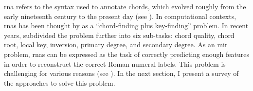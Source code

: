 

\gls{rna} refers to the syntax used to annotate chords,
which evolved roughly from the early nineteenth century to
the present day (see
). In
computational contexts, \glspl{rna} has been thought by
\textcite{temperley1997algorithm} as a ``chord-finding plus
key-finding'' problem. In recent years,
\textcite{chen2018functional} subdivided the problem further
into six sub-tasks: chord quality, chord root, local key,
inversion, primary degree, and secondary degree. As an
\gls{mir} problem, \glspl{rna} can be expressed as the task
of correctly predicting enough features in order to
reconstruct the correct Roman numeral labels. This problem
is challenging for various reasons (see
). In the next section, I present a
survey of the approaches to solve this problem.






